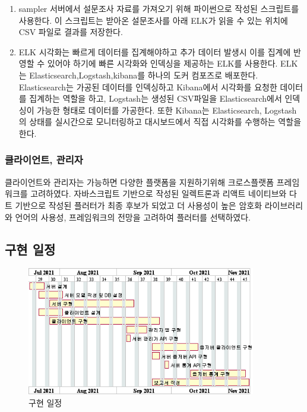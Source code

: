 \documentclass[8pt,a4paper,left=8mm,right=8mm,top=10mm,bottom=10mm]{article}
\begin{document}
    \begin{enumerate}
        \item sampler
            서버에서 설문조사 자료를 가져오기 위해 파이썬으로 작성된 스크립트를 사용한다. 이 스크립트는 받아온 설문조사를 아래 ELK가 읽을 수 있는 위치에 CSV 파일로 결과를 저장한다.
        \item ELK
            시각화는 빠르게 데이터를 집계해야하고 추가 데이터 발생시 이를 집계에 반영할 수 있어야 하기에 빠른 시각화와 인덱싱을 제공하는 ELK를 사용한다. ELK는 Elasticsearch,Logstash,kibana를 하나의 도커 컴포즈로 배포한다. Elasticsearch는 가공된 데이터를 인덱싱하고 Kibana에서 시각화를 요청한 데이터를 집계하는 역할을 하고, Logstash는 생성된 CSV파일을 Elasticsearch에서 인덱싱이 가능한 형태로 데이터를 가공한다. 또한 Kibana는 Elasticsearch, Logstash의 상태를 실시간으로 모니터링하고 대시보드에서 직접 시각화를 수행하는 역할을 한다.
    \end{enumerate}

    \subsubsection{클라이언트, 관리자}

    클라이언트와 관리자는 가능하면 다양한 플랫폼을 지원하기위해 크로스플랫폼 프레임워크를 고려하였다. 자바스크립트 기반으로 작성된 일렉트론과 리액트 네이티브와 다트 기반으로 작성된 플러터가 최종 후보가 되었고 더 사용성이 높은 암호화 라이브러리와 언어의 사용성, 프레임워크의 전망을 고려하여 플러터를 선택하였다.

\subsection{구현 일정}

    \begin{figure}[h]
        \begin{center}
            \includegraphics[width=10cm]{schedule}
            \caption{구현 일정}
        \end{center}
    \end{figure}
\end{document}
